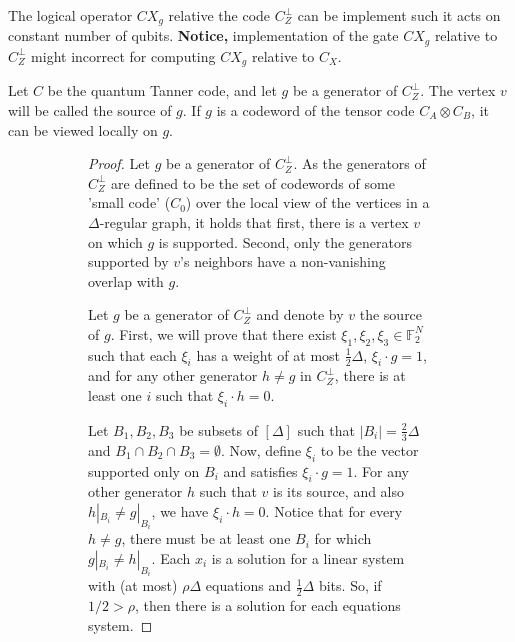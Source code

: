 \documentclass[manuscript,screen,review]{acmart}
\begin{document}
\begin{claim}
  The logical operator $CX_{g}$ relative the code $C_{Z}^{\perp}$ can be
  implement such it acts on constant number of qubits. \textbf{Notice,}
  implementation of the gate $CX_{g}$ relative to $C_{Z}^{\perp}$ might
  incorrect for computing $CX_{g}$ relative to $C_{X}$.
\end{claim}

\begin{definition}
  Let $C$ be the quantum Tanner code, and let $g$ be a generator of
  $C_{Z}^{\perp}$. The vertex $v$ will be called the source of $g$. If $g$ is a
  codeword of the tensor code $C_{A}\otimes C_{B}$, it can be viewed locally on
  $g$.
\end{definition}

\begin{figure}[h]
  \begin{subfigure}{0.5\textwidth}
    \begin{proof}
      Let $g$ be a generator of $C_{Z}^{\perp}$. As the generators of
      $C_{Z}^\perp$ are defined to be the set of codewords of some 'small code'
      ($C_{0}$) over the local view of the vertices in a $\Delta$-regular
      graph, it
      holds that first, there is a vertex $v$ on which $g$ is supported. Second,
      only the generators supported by $v$'s neighbors have a non-vanishing
      overlap
      with $g$.

      Let $g$ be a generator of $C_{Z}^{\perp}$ and denote by $v$ the source of
      $g$. First, we will prove that there exist $\xi_{1}, \xi_{2}, \xi_{3} \in
      \mathbb{F}_{2}^{N}$ such that each $\xi_{i}$ has a weight of at most
      $\frac{1}{2} \Delta$, $\xi_{i} \cdot g = 1$, and for any other generator
      $h
      \neq g$ in $C_{Z}^{\perp}$, there is at least one $i$ such that $\xi_{i}
      \cdot
      h = 0$.

      Let $B_1, B_2, B_3$ be subsets of $[\Delta]$ such that $|B_i| =
      \frac{2}{3}\Delta$ and $B_1 \cap B_2 \cap B_3 = \emptyset$. Now, define
      $\xi_i$ to be the vector supported only on $B_i$ and satisfies $\xi_i
      \cdot g
      = 1$. For any other generator $h$ such that $v$ is its source, and also
      $h|_{B_{i}} \neq g|_{B_{i}}$, we have $\xi_i \cdot h = 0$. Notice that for
      every $h \neq g$, there must be at least one $B_{i}$ for which $g|_{B_{i}}
      \neq h|_{B_{i}}$. Each $x_{i}$ is a solution for a linear system with (at
      most) $\rho\Delta$ equations and $\frac{1}{2} \Delta$ bits. So, if $1/2 >
      \rho$, then there is a solution for each equations system.


\end{proof}
\end{subfigure}
\end{figure}
\end{document}

